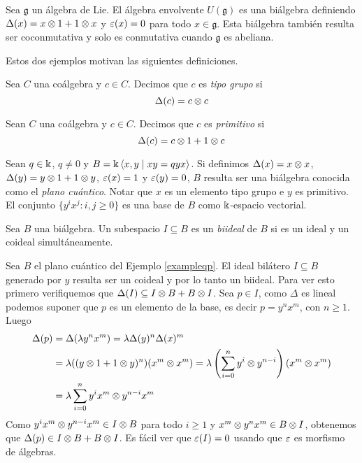 \documentclass[a4paper,oneside,fleqn,11pt,../tesis.tex]{subfiles}
\begin{document}
\begin{example}
	Sea $\mathfrak{g}$ un álgebra de Lie. El álgebra envolvente $U(\mathfrak{g})$ es una biálgebra definiendo
	$\Delta(x) = x \otimes 1 + 1 \otimes x$ y $\varepsilon(x) = 0$ para todo $x \in \mathfrak{g}$. Esta biálgebra también
	resulta ser coconmutativa y solo es conmutativa cuando $\mathfrak{g}$ es abeliana.
\end{example}

Estos dos ejemplos motivan las siguientes definiciones.

\begin{definition}
	Sea $C$ una coálgebra y $c \in C$. Decimos que $c$ es \emph{tipo grupo}
	si
	\[
		\Delta(c) = c \otimes c
	\]
\end{definition}

\begin{definition}
	Sean $C$ una coálgebra y $c \in C$. Decimos que $c$ es \emph{primitivo}
	si
		\[\Delta(c) = c \otimes 1 + 1 \otimes c\]
\end{definition}

\begin{example}\label{exampleqp}
	Sean $q \in \Bbbk$, $q \neq 0$ y $B = \Bbbk \left\langle x, y \mid xy = qyx \right\rangle$. Si definimos
	$\Delta(x) = x \otimes x$, $\Delta(y) = y \otimes 1 + 1 \otimes y$, $\varepsilon(x) = 1$ y $\varepsilon(y) = 0$, $B$ resulta ser una
	biálgebra conocida como el \emph{plano cuántico}. Notar que $x$ es un elemento tipo grupo e $y$ es primitivo.
	El conjunto $\{ y^ix^j : i, j \geq 0\}$ es una base de $B$ como $\Bbbk$-espacio vectorial.
\end{example}

\begin{definition}
	Sea $B$ una biálgebra. Un subespacio $I \subseteq B$ es un \emph{biideal} de $B$ si es un ideal y un coideal
	simultáneamente.
\end{definition}

\begin{example}
	Sea $B$ el plano cuántico del Ejemplo \ref{exampleqp}. El ideal bilátero $I \subseteq B$ generado por $y$
	resulta ser un coideal y por lo tanto un biideal. Para ver esto
	primero verifiquemos que $\Delta(I) \subseteq I \otimes B + B \otimes I$. Sea $p \in I$, como $\Delta$ es lineal
	podemos suponer que $p$ es un elemento de la base, es decir $p = y^nx^m$, con $n \geq 1$. Luego
	\begin{align*}
		\Delta(p) &= \Delta(	\lambda y^nx^m) = \lambda \Delta(y)^n \Delta(x)^m  \\
		&= \lambda ((y\otimes 1 + 1 \otimes y)^n) (x^m \otimes x^m)
			= \lambda \left(\sum_{i = 0}^n y^i \otimes y^{n - i}\right) (x^m \otimes x^m) \\
		&= \lambda \sum_{i = 0}^n y^ix^m \otimes y^{n - i}x^m 
	\end{align*}
	Como $y^ix^m \otimes y^{n - i}x^m \in I \otimes B$ para todo $i \geq 1$ y $x^m \otimes y^nx^m \in B \otimes I$,
	obtenemos que $\Delta(p) \in I \otimes B + B \otimes I$. Es fácil ver que $\varepsilon(I) = 0$ usando que $\varepsilon$
	es morfismo de álgebras. 
\end{example}
\end{document}
